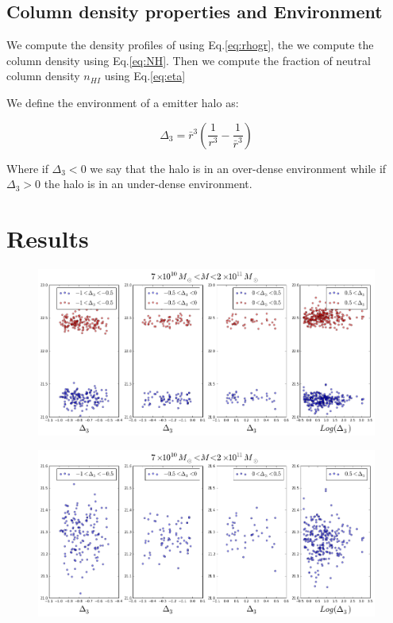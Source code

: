 \documentclass[12pt]{article}
\begin{document}
\subsection{Column density properties and Environment}

We compute the density profiles of using Eq.\ref{eq:rhogr}, the
we compute the column density using Eq.\ref{eq:NH}. Then we compute
the fraction of neutral column density $n_{HI}$ using Eq.\ref{eq:eta}

We define the environment of a emitter halo as:

\begin{equation}
\Delta_3  = \bar{r}^3 \left( \dfrac{1}{r^3} - \dfrac{1}{\bar{r}^3} \right)
\end{equation}

Where if $\Delta_3 < 0 $ we say that the halo is in an over-dense
environment while
if $\Delta_3 > 0 $ the halo is in an under-dense environment.

\section{Results}

\begin{figure}[H]
\centering
\includegraphics[scale=0.4]{../figures/NHI.png}
\end{figure}

\begin{figure}[H]
\centering
\includegraphics[scale=0.4]{../figures/NHIvsD3.png}
\end{figure}
\end{document}
